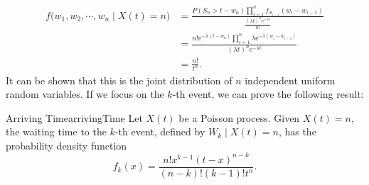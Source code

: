 \documentclass[math, code]{amznotes}
\theoremstyle{remark}
\newcommand{\e}{\mathrm{e}}
\begin{document}
\begin{align*}
    f\bigl(w_1, w_2, \cdots, w_n \mid X\left(t\right) = n\bigr) & = \frac{P\left(S_n > t - w_n\right)\prod_{i = 1}^nf_{S_{i - 1}}\left(w_i - w_{i - 1}\right)}{\frac{\left(\lambda t\right)^n\e^{-\lambda t}}{n!}} \\
    & = \frac{n!\e^{-\lambda\left(t - w_n\right)}\prod_{i = 1}^n\lambda\e^{-\lambda\left(w_i - w_{i - 1}\right)}}{\left(\lambda t\right)^n\e^{-\lambda t}} \\
    & = \frac{n!}{t^n}.
\end{align*}
It can be shown that this is the joint distribution of $n$ independent uniform random variables. If we focus on the $k$-th event, we can prove the following result:
\begin{thmbox}{Arriving Time}{arrivingTime}
    Let $X\left(t\right)$ be a Poisson process. Given $X\left(t\right) = n$, the waiting time to the $k$-th event, defined by $W_k \mid X\left(t\right) = n$, has the probability density function 
    \begin{equation*}
        f_k\left(x\right) = \frac{n!x^{k - 1}\left(t - x\right)^{n - k}}{\left(n - k\right)!\left(k - 1\right)!t^n}.
    \end{equation*}
\end{thmbox}
\end{document}
